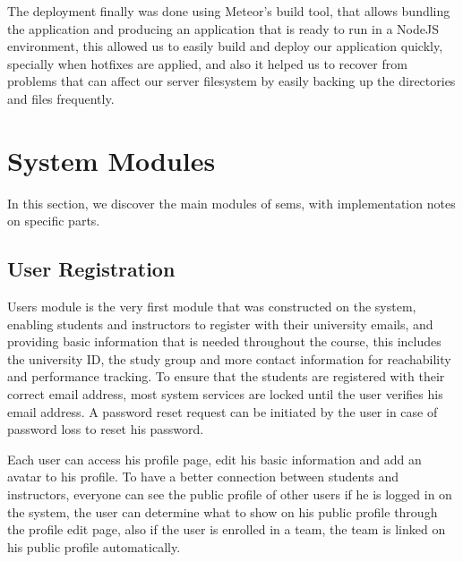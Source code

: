 \newParagraph
The deployment finally was done using Meteor's build tool, that allows bundling the application and producing an application that is ready
to run in a NodeJS environment, this allowed us to easily build and deploy our application quickly, specially when hotfixes are applied,
and also it helped us to recover from problems that can affect our server filesystem by easily backing up the directories and files frequently.


\section{System Modules}
\label{sec:modules}

In this section, we discover the main modules of \ac{sems}, with implementation notes on specific parts.

\subsection{User Registration}
\label{sub:registration}
Users module is the very first module that was constructed on the system, enabling students and instructors to register with their
university emails, and providing basic information that is needed throughout the course, this includes the university ID, the study group
and more contact information for reachability and performance tracking. To ensure that the students are registered with their correct email
address, most system services are locked until the user verifies his email address. A password reset request can be initiated by the user
in case of password loss to reset his password.

\newParagraph
Each user can access his profile page, edit his basic information and add an avatar to his profile. To have a better connection
between students and instructors, everyone can see the public profile of other users if he is logged in on the system, the user
can determine what to show on his public profile through the profile edit page, also if the user is enrolled in a team, the team
is linked on his public profile automatically.

